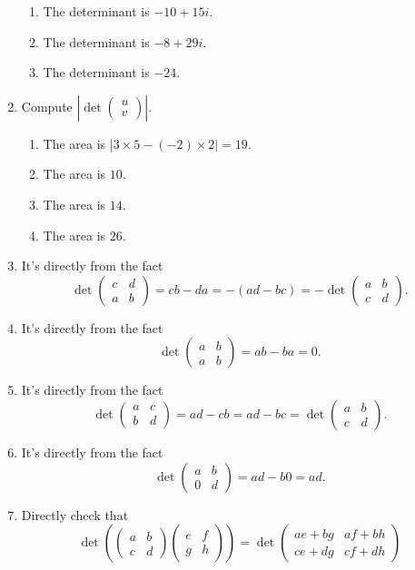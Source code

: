 \begin{enumerate}
\begin{enumerate}
\item The determinant is $-10+15i$.
\item The determinant is $-8+29i$.
\item The determinant is $-24$.
\end{enumerate}
\item Compute $|\det\begin{pmatrix}u\\v\end{pmatrix}|$.\begin{enumerate}
\item The area is $|3\times 5-(-2)\times 2|=19$.
\item The area is $10$.
\item The area is $14$.
\item The area is $26$.
\end{enumerate}
\item It's directly from the fact 
\[\det\begin{pmatrix}c&d\\a&b\end{pmatrix}=cb-da=-(ad-bc)=-\det\begin{pmatrix}a&b\\c&d\end{pmatrix}.\]
\item It's directly from the fact 
\[\det\begin{pmatrix}a&b\\a&b\end{pmatrix}=ab-ba=0.\]
\item It's directly from the fact 
\[\det\begin{pmatrix}a&c\\b&d\end{pmatrix}=ad-cb=ad-bc=\det\begin{pmatrix}a&b\\c&d\end{pmatrix}.\]
\item It's directly from the fact 
\[\det\begin{pmatrix}a&b\\0&d\end{pmatrix}=ad-b0=ad.\]
\item Directly check that 
\[\det(\begin{pmatrix}a&b\\c&d\end{pmatrix}\begin{pmatrix}e&f\\g&h\end{pmatrix})=\det\begin{pmatrix}ae+bg&af+bh\\ce+dg&cf+dh\end{pmatrix}\]

\end{enumerate}

